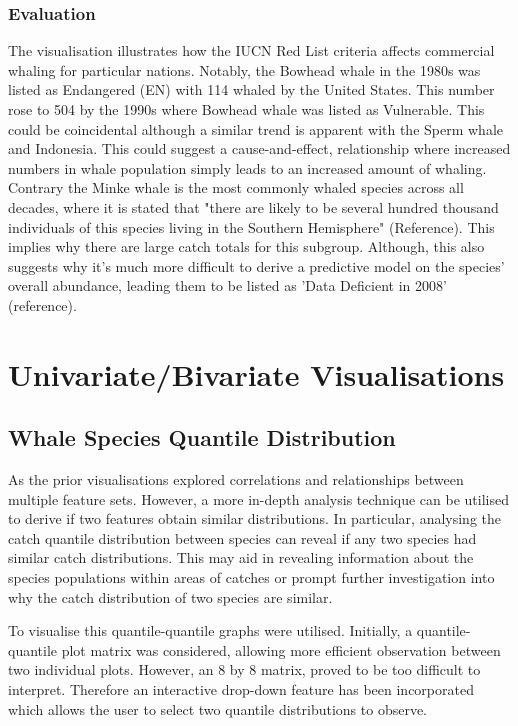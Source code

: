 \documentclass[12pt,a4paper]{article}
\begin{document}
\subsubsection{Evaluation}
The visualisation illustrates how the IUCN Red List criteria affects commercial whaling for particular nations. Notably, the Bowhead whale in the 1980s was listed as Endangered (EN) with 114 whaled by the United States. This number rose to 504 by the 1990s where Bowhead whale was listed as Vulnerable. This could be coincidental although a similar trend is apparent with the Sperm whale and Indonesia. This could suggest a cause-and-effect, relationship where increased numbers in whale population simply leads to an increased amount of whaling. Contrary the Minke whale is the most commonly whaled species across all decades, where it is stated that "there are likely to be several hundred
thousand individuals of this species living in the
Southern Hemisphere" (Reference). This implies why there are large catch totals for this subgroup. Although, this also suggests why it's much more difficult to derive a predictive model on the species' overall abundance, leading them to be listed as 'Data
Deficient in 2008' (reference).


\section{Univariate/Bivariate Visualisations}

\subsection{Whale Species Quantile Distribution}
As the prior visualisations explored correlations and relationships between multiple feature sets. However, a more in-depth analysis technique can be utilised to derive if two features obtain similar distributions. In particular, analysing the catch quantile distribution between species can reveal if any two species had similar catch distributions. This may aid in revealing information about the species populations within areas of catches or prompt further investigation into why the catch distribution of two species are similar. 


To visualise this quantile-quantile graphs were utilised. Initially, a quantile-quantile plot matrix was considered, allowing more efficient observation between two individual plots. However, an 8 by 8 matrix, proved to be too difficult to interpret. Therefore an interactive drop-down feature has been incorporated which allows the user to select two quantile distributions to observe. 
\end{document}

